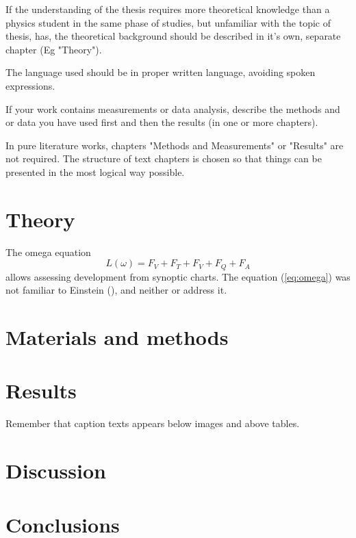 \documentclass[english,twoside,openright]{HYgradu}
\begin{document}
If the understanding of the thesis requires more theoretical knowledge
than a physics student in the same phase of studies, but unfamiliar
with the topic of thesis, has, the theoretical background should be
described in it's own, separate chapter (Eg "Theory").

The language used should be in proper written language, avoiding
spoken expressions.

If your work contains measurements or data analysis, describe the
methods and or data you have used first and then the results (in one
or more chapters).

In pure literature works, chapters "Methods and Measurements" or
"Results" are not required. The structure of text chapters is chosen
so that things can be presented in the most logical way possible.

\section{Theory}
%
%

The omega equation
\begin{equation}
\label{eq:omega}
L(\omega)=F_V + F_T + F_V + F_Q + F_A
\end{equation}
allows assessing development from synoptic charts. The equation
(\ref{eq:omega}) was not familiar to Einstein (\cite{einstein}), and
neither \cite{latexcompanion} or \cite{knuthwebsite} address it.

\section{Materials and methods}


\section{Results}

Remember that caption texts appears below images and above tables.

\section{Discussion}

\section{Conclusions}
\end{document}
